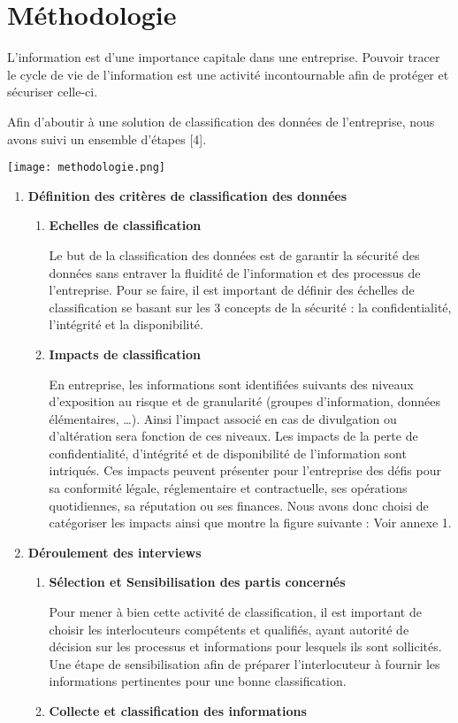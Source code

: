 \section{Méthodologie}

L’information est d’une importance capitale dans une entreprise. Pouvoir tracer le cycle de vie de l’information est une activité incontournable afin de protéger et sécuriser celle-ci.

Afin d’aboutir à une solution de classification des données de l’entreprise, nous avons suivi un ensemble d’étapes [4].

\texttt{[image: methodologie.png]}

\begin{enumerate}
   \item \textbf{Définition des critères de classification des données}
   \begin{enumerate}
     \item \textbf{Echelles de classification}
     
     Le but de la classification des données est de garantir la sécurité des données sans entraver la fluidité de l’information et des processus de l’entreprise. Pour se faire, il est important de définir des échelles de classification se basant sur les 3 concepts de la sécurité : la confidentialité, l’intégrité et la disponibilité.
     \item \textbf{Impacts de classification}
     
     En entreprise, les informations sont identifiées suivants des niveaux d’exposition au risque et de granularité (groupes d’information, données élémentaires, …). Ainsi l’impact associé en cas de divulgation ou d’altération sera fonction de ces niveaux. Les impacts de la perte de confidentialité, d’intégrité et de disponibilité de l’information sont intriqués.  Ces impacts peuvent présenter pour l’entreprise des défis pour sa conformité légale, réglementaire et contractuelle, ses opérations quotidiennes, sa réputation ou ses finances. Nous avons donc choisi de catégoriser les impacts ainsi que  montre la figure suivante : Voir annexe 1.
   \end{enumerate}
   \item \textbf{Déroulement des interviews}
   \begin{enumerate}
       \item \textbf{Sélection et Sensibilisation des partis concernés}
       
       Pour mener à bien cette activité de classification, il est important de choisir les interlocuteurs compétents et qualifiés, ayant autorité de décision sur les processus et informations pour lesquels ils sont sollicités. Une étape de sensibilisation afin de préparer l’interlocuteur à fournir les informations pertinentes pour une bonne classification.
       \item \textbf{Collecte et classification des informations}
       

\end{enumerate}
\end{enumerate}
